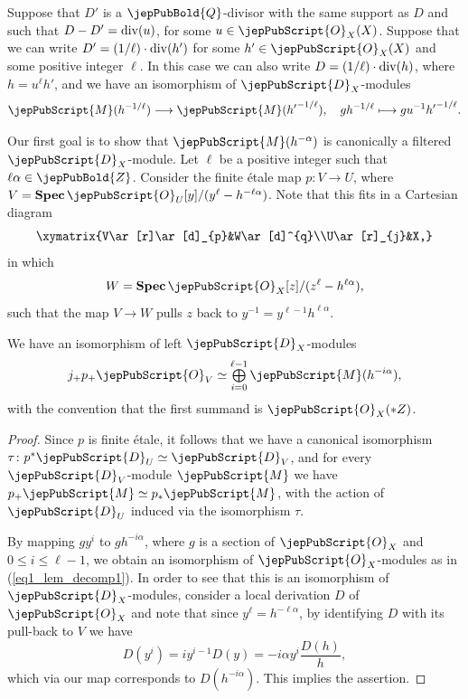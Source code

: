 \begin{remark}\label{rmk_add_eff_div}
Suppose that $D'$ is a $\jepPubBold{Q}$-divisor with the same support as $D$ and such that $D-D'={\rm div}(u)$, for some $u\in\jepPubScript{O}_X(X)$.
Suppose that we can write
$D'=(1/\ell)\cdot {\rm div}(h')$ for some $h'\in\jepPubScript{O}_X(X)$ and some positive integer $\ell$.
In this case we can also write
$D=(1/\ell)\cdot {\rm div}(h)$, where $h=u^{\ell}{h'}$, and  we
have an isomorphism of  $\jepPubScript{D}_X$-modules
\begin{equation}\label{isom_add_1}
\jepPubScript{M}(h^{-1/\ell})\longrightarrow \jepPubScript{M}({h'}^{-1/\ell}), \,\,\,\,\,\,gh^{-1/\ell} \longmapsto gu^{-1}{h'}^{-1/\ell}.
\end{equation}
\end{remark}

\medskip

Our first goal is to show that $\jepPubScript{M}(h^{-\alpha})$ is canonically a filtered $\jepPubScript{D}_X$-module. 
Let $\ell$ be a positive integer such that $\ell\alpha\in\jepPubBold{Z}$.
Consider the finite \'{e}tale map $p\colon V\to U$, where $V={\bf Spec}\,\jepPubScript{O}_U[y]/(y^{\ell}-h^{-\ell\alpha})$.
Note that this fits in a Cartesian diagram
\begin{equation}\label{cart_diag1}
{\def\labelstyle{\textstyle}\xymatrix{V\ar[r]\ar[d]_{p}&W\ar[d]^{q}\\U\ar[r]_{j}&X,}}
\end{equation}
in which
$$W={\bf Spec}\,\jepPubScript{O}_X[z]/(z^\ell-h^{\ell\alpha}),$$
such that the map $V\to W$ pulls $z$ back to $y^{-1}=y^{\ell-1}h^{\ell\alpha}$. 


\begin{lemma}\label{lem_decomp1}
We have an isomorphism of left $\jepPubScript{D}_X$-modules
\begin{equation}\label{eq1_lem_decomp1}
j_+p_+\jepPubScript{O}_V\simeq\mathop{\textstyle\bigoplus}\limits_{i=0}^{\ell-1}\jepPubScript{M}(h^{-i\alpha}),
\end{equation}
with the convention that the first summand is $\jepPubScript{O}_X(*Z)$.
\end{lemma}

\begin{proof}
Since $p$ is finite \'{e}tale, it follows that we have a canonical isomorphism $\tau\colon p^*\jepPubScript{D}_U\simeq\jepPubScript{D}_V$, 
and for every $\jepPubScript{D}_V$-module $\jepPubScript{M}$ we have $p_+\jepPubScript{M}\simeq p_*\jepPubScript{M}$,
with the action of $\jepPubScript{D}_U$ induced via the isomorphism $\tau$.

By mapping $gy^i$ to $gh^{-i\alpha}$, where $g$ is a section of $\jepPubScript{O}_X$ and $0\leqslant i\leqslant\ell-1$, we obtain an isomorphism 
of $\jepPubScript{O}_X$-modules as in
(\ref{eq1_lem_decomp1}). In order to see that this is an isomorphism of $\jepPubScript{D}_X$-modules, consider a local derivation
$D$ of $\jepPubScript{O}_X$ and note that since $y^{\ell}=h^{-\ell\alpha}$, by identifying $D$ with its pull-back to $V$ we have
$$D (y^i)=iy^{i-1}D(y)=-i\alpha y^i\frac{D(h)}{h},$$
which via our map corresponds to $D (h^{-i\alpha})$.
This implies the assertion.
\end{proof}

